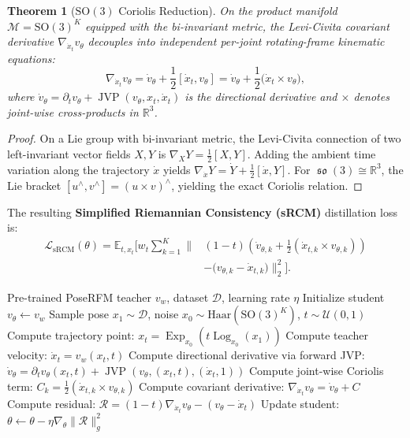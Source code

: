 \documentclass[10pt,twocolumn,letterpaper]{article}
\DeclareMathOperator{\Exp}{Exp}
\DeclareMathOperator{\Log}{Log}
\DeclareMathOperator{\so}{\mathfrak{so}}
\DeclareMathOperator{\JVP}{JVP}
\newtheorem{theorem}{Theorem}
\begin{document}
\begin{theorem}[$\mathrm{SO}(3)$ Coriolis Reduction]
On the product manifold $\mathcal{M} = \mathrm{SO}(3)^K$ equipped with the bi-invariant metric, the Levi-Civita covariant derivative $\nabla_{\dot{x}_t} v_\theta$ decouples into independent per-joint rotating-frame kinematic equations:
\begin{equation}
\nabla_{\dot{x}_t} v_\theta = \dot{v}_\theta + \frac{1}{2}[\dot{x}_t, v_\theta] = \dot{v}_\theta + \frac{1}{2}\big(\dot{x}_t \times v_\theta\big),
\end{equation}
where $\dot{v}_\theta = \partial_t v_\theta + \JVP(v_\theta, x_t, \dot{x}_t)$ is the directional derivative and $\times$ denotes joint-wise cross-products in $\mathbb{R}^3$.
\end{theorem}
\begin{proof}
On a Lie group with bi-invariant metric, the Levi-Civita connection of two left-invariant vector fields $X, Y$ is $\nabla_X Y = \frac{1}{2}[X, Y]$. Adding the ambient time variation along the trajectory $\dot{x}$ yields $\nabla_{\dot{x}} Y = \dot{Y} + \frac{1}{2}[\dot{x}, Y]$. For $\so(3) \cong \mathbb{R}^3$, the Lie bracket $[u^\wedge, v^\wedge] = (u \times v)^\wedge$, yielding the exact Coriolis relation.
\end{proof}

The resulting \textbf{Simplified Riemannian Consistency (sRCM)} distillation loss is:
\begin{align}
\mathcal{L}_{\mathrm{sRCM}}(\theta) = \mathbb{E}_{t, x_t} \Big[ w_t \sum_{k=1}^K \Big\| &(1 - t)\left( \dot{v}_{\theta, k} + \frac{1}{2}(\dot{x}_{t, k} \times v_{\theta, k}) \right) \nonumber \\
&- \big(v_{\theta, k} - \dot{x}_{t, k}\big) \Big\|_2^2 \Big].
\end{align}

\begin{algorithm}[t]
\caption{Fast-PoseRFM Training via Simplified RCM}
\label{alg:training}
\begin{algorithmic}[1]
\Require Pre-trained PoseRFM teacher $v_w$, dataset $\mathcal{D}$, learning rate $\eta$
\State Initialize student $v_\theta \leftarrow v_w$
    \State Sample pose $x_1 \sim \mathcal{D}$, noise $x_0 \sim \mathrm{Haar}(\mathrm{SO}(3)^K)$, $t \sim \mathcal{U}(0, 1)$
    \State Compute trajectory point: $x_t = \Exp_{x_0}(t \Log_{x_0}(x_1))$
    \State Compute teacher velocity: $\dot{x}_t = v_w(x_t, t)$
    \State Compute directional derivative via forward JVP:
    \State \quad $\dot{v}_\theta = \partial_t v_\theta(x_t, t) + \JVP(v_\theta, (x_t, t), (\dot{x}_t, 1))$
    \State Compute joint-wise Coriolis term: $C_k = \frac{1}{2}(\dot{x}_{t, k} \times v_{\theta, k})$
    \State Compute covariant derivative: $\nabla_{\dot{x}_t} v_\theta = \dot{v}_\theta + C$
    \State Compute residual: $\mathcal{R} = (1 - t)\nabla_{\dot{x}_t} v_\theta - (v_\theta - \dot{x}_t)$
    \State Update student: $\theta \leftarrow \theta - \eta \nabla_\theta \|\mathcal{R}\|_g^2$
\EndWhile
\end{algorithmic}
\end{algorithm}
\end{document}
